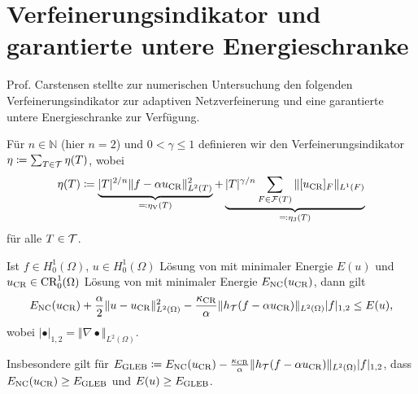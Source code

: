 \section{Verfeinerungsindikator und garantierte untere Energieschranke}
Prof. Carstensen stellte zur numerischen Untersuchung den folgenden
Verfeinerungsindikator zur adaptiven Netzverfeinerung  und eine 
garantierte untere Energieschranke zur Verfügung.

\begin{definition}[Verfeinerungsindikator]\label{def:refinementIndicator}
  Für $n\in\mathbb{N}$ (hier $n=2$) und $0<\gamma\leq 1$ definieren wir den
  Verfeinerungsindikator $\eta\coloneqq\sum_{T\in\mathcal{T}}\eta(T)$, wobei
  \begin{align} \label{eq:refinementIndicator} 
    \eta (T)\coloneqq
    \underbrace{|T|^{2/n}\Vert f-\alpha u_\textup{CR}\Vert^2_{L^2(T)}}_{\eqqcolon
    \eta_\text{V}(T)} +\underbrace{|T|^{\gamma/n}\sum_{F\in\mathcal{F}(T)}\Vert
    [u_\textup{CR}]_F\Vert_{L^1(F)}}_{ \eqqcolon \eta_\text{J}(T)} 
  \end{align} 
  für alle $T\in\mathcal{T}$.
\end{definition}

\begin{theorem}
  \label{thm:gleb}
  Ist $f\in H^1_0(\Omega)$, $u\in H^1_0(\Omega)$ Lösung von
   mit minimaler Energie $E(u)$ und $u_\textup{CR}\in
  \textup{CR}^1_0(\Omega)$ Lösung von  mit minimaler Energie
  $E_\textup{NC}(u_\textup{CR})$, dann gilt
  \begin{align}
    \label{eq:gleb}
    E_\textup{NC}(u_\textup{CR})+\frac{\alpha}{2}\Vert u-u_\textup{CR}\Vert_{L^2(\Omega)}^2
    -\frac{\kappa_{\textup{CR}}}{\alpha}\Vert
    h_{\mathcal{T}}(f-\alpha u_\textup{CR})\Vert_{L^2(\Omega)} |f|_{1,2}\leq E(u),
  \end{align}
  wobei $|\bullet|_{1,2}=\Vert\nabla \bullet\Vert_{L^2(\Omega)}$.
  
  Insbesondere gilt für 
  $E_\textup{GLEB} \coloneqq 
    E_\textup{NC}(u_\textup{CR}) - \frac{\kappa_{\textup{CR}}}{\alpha}\Vert
    h_{\mathcal{T}}(f-\alpha u_\textup{CR})\Vert_{L^2(\Omega)} |f|_{1,2}$, dass
    $E_\textup{NC}(u_\textup{CR})\geq E_\textup{GLEB}$ und $E(u)\geq E_\textup{GLEB}$.
\end{theorem}

